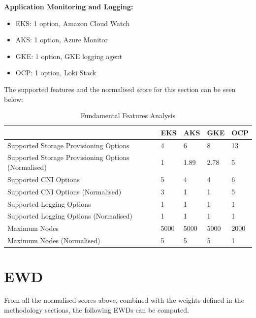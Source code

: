 \textbf{Application Monitoring and Logging:}

\begin{itemize}
\tightlist
\item
  EKS: 1 option, Amazon Cloud Watch \cite{MonitorYourCluster}
\item
  AKS: 1 option, Azure Monitor \cite{martinekuanMonitorMicroservicesApplication}
\item
  GKE: 1 option, GKE logging agent \cite{GKELogsGoogle} 
\item
  OCP: 1 option, Loki Stack \cite{Logging60Logging}
\end{itemize}

The supported features and the normalised score for this section can be seen below:

\begin{table}[!ht]
    \centering
    \begin{tabular}{|p{4cm}|p{2cm}|p{2cm}|p{2cm}|p{2cm}|} %
    \hline
         & EKS & AKS & GKE & OCP \\ \hline
        Supported Storage Provisioning Options & 4& 6& 8& 13\\ \hline
        Supported Storage Provisioning Options (Normalised)& 1& 1.89& 2.78& 5\\ \hline
        Supported CNI Options& 5& 4& 4& 6\\ \hline
        Supported CNI Options (Normalised)& 3& 1& 1& 5\\ \hline
        Supported Logging Options& 1& 1& 1& 1\\ \hline
 Supported Logging Options (Normalised)& 1& 1& 1&1\\\hline
 Maximum Nodes& 5000& 5000& 5000&2000\\\hline
 Maximum Nodes (Normalised)& 5& 5& 5&1\\\hline
    \end{tabular}
    \caption{Fundamental Features Analysis} 
    \label{tab:cost-analysis}
\end{table}

\FloatBarrier

\section{EWD}

From all the normalised scores above, combined with the weights defined in the methodology sections, the following EWDs can be computed.

